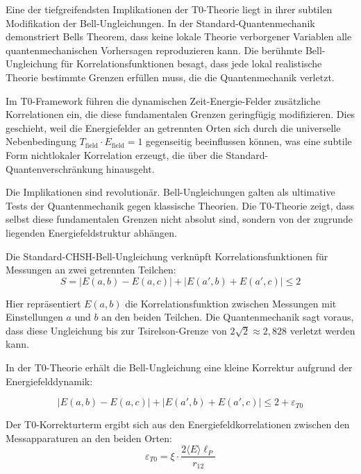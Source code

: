 \documentclass[12pt,a4paper]{article}
\newcommand{\xipar}{\xi}
\theoremstyle{definition}
\theoremstyle{remark}
\begin{document}
Eine der tiefgreifendsten Implikationen der T0-Theorie liegt in ihrer subtilen Modifikation der Bell-Ungleichungen. In der Standard-Quantenmechanik demonstriert Bells Theorem, dass keine lokale Theorie verborgener Variablen alle quantenmechanischen Vorhersagen reproduzieren kann. Die berühmte Bell-Ungleichung für Korrelationsfunktionen besagt, dass jede lokal realistische Theorie bestimmte Grenzen erfüllen muss, die die Quantenmechanik verletzt.

Im T0-Framework führen die dynamischen Zeit-Energie-Felder zusätzliche Korrelationen ein, die diese fundamentalen Grenzen geringfügig modifizieren. Dies geschieht, weil die Energiefelder an getrennten Orten sich durch die universelle Nebenbedingung $T_{\text{field}} \cdot E_{\text{field}} = 1$ gegenseitig beeinflussen können, was eine subtile Form nichtlokaler Korrelation erzeugt, die über die Standard-Quantenverschränkung hinausgeht.

Die Implikationen sind revolutionär. Bell-Ungleichungen galten als ultimative Tests der Quantenmechanik gegen klassische Theorien. Die T0-Theorie zeigt, dass selbst diese fundamentalen Grenzen nicht absolut sind, sondern von der zugrunde liegenden Energiefeldstruktur abhängen.

Die Standard-CHSH-Bell-Ungleichung verknüpft Korrelationsfunktionen für Messungen an zwei getrennten Teilchen:
\begin{equation}
	S = |E(a,b) - E(a,c)| + |E(a',b) + E(a',c)| \leq 2
	\label{eq:standard_bell}
\end{equation}

Hier repräsentiert $E(a,b)$ die Korrelationsfunktion zwischen Messungen mit Einstellungen $a$ und $b$ an den beiden Teilchen. Die Quantenmechanik sagt voraus, dass diese Ungleichung bis zur Tsirelson-Grenze von $2\sqrt{2} \approx 2{,}828$ verletzt werden kann.

In der T0-Theorie erhält die Bell-Ungleichung eine kleine Korrektur aufgrund der Energiefelddynamik:

\begin{equation}
	\boxed{|E(a,b) - E(a,c)| + |E(a',b) + E(a',c)| \leq 2 + \varepsilon_{T0}}
	\label{eq:modified_bell}
\end{equation}

Der T0-Korrekturterm ergibt sich aus den Energiefeldkorrelationen zwischen den Messapparaturen an den beiden Orten:
\begin{equation}
	\varepsilon_{T0} = \xipar \cdot \frac{2\langle E \rangle \ell_P}{r_{12}}
	\label{eq:t0_bell_correction}
\end{equation}
\end{document}
